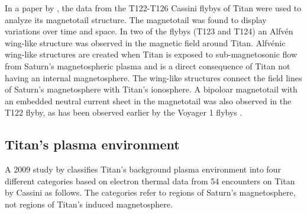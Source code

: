 \documentclass[12pt, parskip=full*, abstract]{scrartcl}
\begin{document}
In a paper by \textcite{alfven-wing-structure}, the data from the T122-T126 Cassini flybys of Titan were used to analyze its magnetotail structure. The magnetotail was found to display variations over time and space. In two of the flybys (T123 and T124) an Alfvén wing-like structure was observed in the magnetic field around Titan. Alfvénic wing-like structures are created when Titan is exposed to sub-magnetosonic flow from Saturn's magnetospheric plasma and is a direct consequence of Titan not having an internal magnetosphere. The wing-like structures connect the field lines of Saturn's magnetosphere with Titan's ionosphere. A bipoloar magnetotail with an embedded neutral current sheet in the magnetotail was also observed in the T122 flyby, as has been observed earlier by the Voyager 1 flybys \parencite{ness-1982}.


\subsection{Titan's plasma environment}
A 2009 study by \textcite{Rymer-class} classifies Titan's background plasma environment into four different categories based on electron thermal data from 54 encounters on Titan by Cassini as follows. The categories refer to regions of Saturn's magnetosphere, not regions of Titan's induced magnetosphere. 
\end{document}
